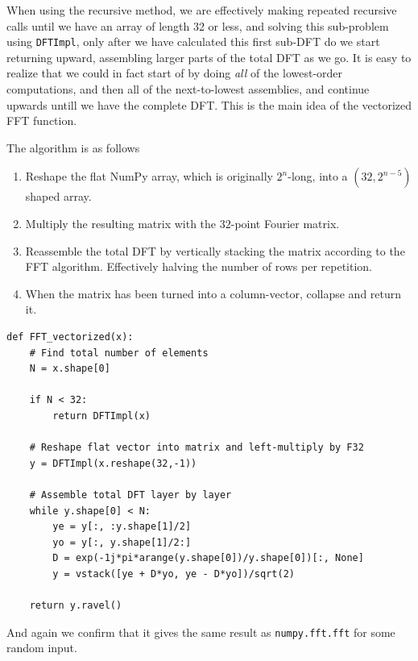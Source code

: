 \documentclass[a4paper, 11pt, notitlepage, english]{article}
\begin{document}
When using the recursive method, we are effectively making repeated recursive calls until we have an array of length 32 or less, and solving this sub-problem using \verb+DFTImpl+, only after we have calculated this first sub-DFT do we start returning upward, assembling larger parts of the total DFT as we go. It is easy to realize that we could in fact start of by doing \emph{all} of the lowest-order computations, and then all of the next-to-lowest assemblies, and continue upwards untill we have the complete DFT. This is the main idea of the vectorized FFT function.

The algorithm is as follows
\begin{enumerate}
    \item Reshape the flat NumPy array, which is originally $2^n$-long, into a $(32,2^{n-5})$ shaped array.
    \item Multiply the resulting matrix with the $32$-point Fourier matrix.
    \item Reassemble the total DFT by vertically stacking the matrix according to the FFT algorithm. Effectively halving the number of rows per repetition.
    \item When the matrix has been turned into a column-vector, collapse and return it.

\end{enumerate}

\begin{lstlisting}
def FFT_vectorized(x):
    # Find total number of elements
    N = x.shape[0]

    if N < 32:
        return DFTImpl(x)

    # Reshape flat vector into matrix and left-multiply by F32
    y = DFTImpl(x.reshape(32,-1))

    # Assemble total DFT layer by layer
    while y.shape[0] < N:
        ye = y[:, :y.shape[1]/2]
        yo = y[:, y.shape[1]/2:]
        D = exp(-1j*pi*arange(y.shape[0])/y.shape[0])[:, None]
        y = vstack([ye + D*yo, ye - D*yo])/sqrt(2)

    return y.ravel()
\end{lstlisting}

And again we confirm that it gives the same result as \verb+numpy.fft.fft+ for some random input.

\clearpage
\end{document}
